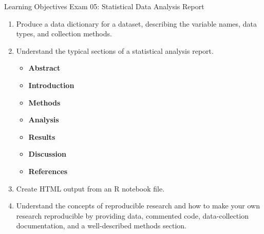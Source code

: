 \documentclass[11pt]{article}
\begin{document}
{\LARGE \textcolor{oiB}{Learning Objectives \hfill Exam 05: Statistical Data Analysis Report}} \\

\begin{enumerate}
\renewcommand\labelenumi{\textcolor{light}{\textbf{LO \theenumi.}}}
\item Produce a data dictionary for a dataset, describing the variable names,
data types, and collection methods.

\item Understand the typical sections of a statistical analysis report.
\begin{itemize}
\renewcommand{\labelitemi}{{\textcolor{dark}{{\tiny $\blacksquare$}}}}
\item \textbf{Abstract}
\item \textbf{Introduction}
\item \textbf{Methods}
\item \textbf{Analysis}
\item \textbf{Results}
\item \textbf{Discussion}
\item \textbf{References}
\end{itemize}

\item Create HTML output from an R notebook file.

\item Understand the concepts of reproducible research and how to make your
own research reproducible by providing data, commented code, data-collection
documentation, and a well-described methods section.

\end{enumerate}
\end{document}
